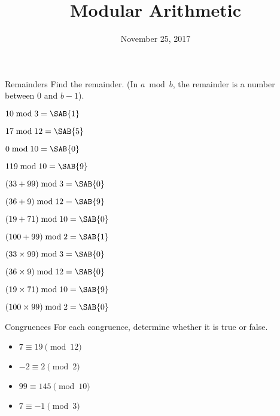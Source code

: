 \documentclass[12pt,letterpaper]{article}
\title{Modular Arithmetic}
\date{November 25, 2017}
\begin{document}
\maketitle

\thispagestyle{empty}

\begin{problem}{Remainders}
 Find the remainder. (In \(a \bmod b\), the remainder is a number between \(0\) and
 \(b-1\)).

 \begin{itemize}
  \begin{multicols}{2}
   \item \(10 \bmod 3 = \SAB{1}\)
   \item \(17 \bmod 12 = \SAB{5}\)
   \item \(0 \bmod 10 = \SAB{0}\)
   \item \(119 \bmod 10 = \SAB{9}\)
   \item \((33 + 99) \bmod 3 = \SAB{0}\)
   \item \((36 + 9) \bmod 12 = \SAB{9}\)
   \item \((19 + 71) \bmod 10 = \SAB{0}\)
   \item \((100 + 99) \bmod 2 = \SAB{1}\)
   \item \((33 \times 99) \bmod 3 = \SAB{0}\)
   \item \((36 \times 9) \bmod 12 = \SAB{0}\)
   \item \((19 \times 71) \bmod 10 = \SAB{9}\)
   \item \((100 \times 99) \bmod 2 = \SAB{0}\)
  \end{multicols}
 \end{itemize}
\end{problem}

\begin{problem}{Congruences}
 For each congruence, determine whether it is true or false.

 \begin{itemize}
   \item \(7 \equiv 19 \pmod {12}\) \hfill \TFTrue
   \item \(-2 \equiv 2 \pmod {2}\) \hfill \TFTrue
   \item \(99 \equiv 145 \pmod {10}\) \hfill \TFFalse
   \item \(7 \equiv -1 \pmod {3}\) \hfill \TFFalse
 \end{itemize}
\end{problem}
\end{document}

